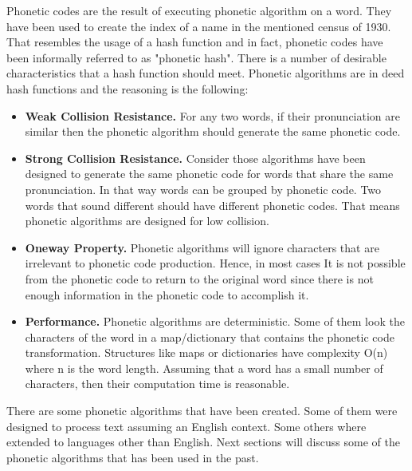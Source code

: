 \documentclass[9pt,conference]{IEEEtran}
\begin{document}
Phonetic codes are the result of executing phonetic algorithm on a word. They have been used
to create the index of a name in the mentioned census of 1930. That resembles the usage of a
hash function and in fact, phonetic codes have been informally referred to as "phonetic hash". 
There is a number of desirable characteristics that a hash function should meet\cite{ref:16}. 
Phonetic algorithms are in deed hash functions and the reasoning is the following:
\begin{itemize}
\item \textbf{Weak Collision Resistance.} For any two words, if their pronunciation 
are similar then the phonetic algorithm should generate the same phonetic code.\\
\item \textbf{Strong Collision Resistance.} Consider those algorithms have been 
designed to generate the same phonetic code for words that share the same 
pronunciation. In that way words can be grouped by phonetic code. Two words 
that sound different should have different phonetic codes. That means phonetic 
algorithms are designed for low collision.\\
\item \textbf{Oneway Property.} Phonetic algorithms will ignore characters that 
are irrelevant to phonetic code production. Hence, in most cases It is not possible 
from the phonetic code to return to the original word since there is not enough 
information in the phonetic code to accomplish it.\\
\item \textbf{Performance.} Phonetic algorithms are deterministic. Some of them 
look the characters of the word in a map/dictionary that contains the phonetic code 
transformation. Structures like maps or dictionaries have complexity O(n) where n 
is the word length. Assuming that a word has a small number of characters, then 
their computation time is reasonable.\\
\end{itemize}


There are some phonetic algorithms that have been created. Some of them were designed to process text 
assuming an English context. Some others where extended to languages other than English. Next 
sections will discuss some of the phonetic algorithms that has been used in the past.\\
 
\end{document}

